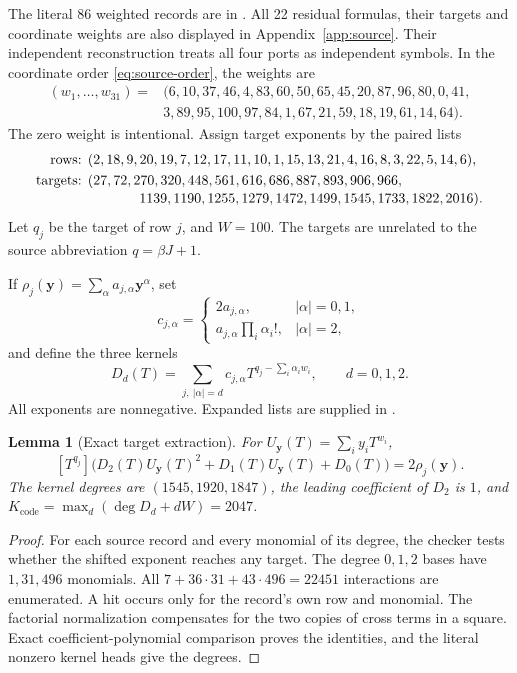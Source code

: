 \documentclass[11pt,a4paper]{article}
\newtheorem{lemma}[theorem]{Lemma}
\theoremstyle{remark}
\newcommand{\Kcode}{K_{\mathrm{code}}}
\newcommand{\code}[1]{\texttt{\detokenize{#1}}}
\begin{document}
The literal 86 weighted records are in
.
All 22 residual formulas, their targets and coordinate weights are
also displayed in Appendix~\ref{app:source}.
Their independent reconstruction treats all four ports as independent
symbols. In the coordinate order \eqref{eq:source-order}, the weights
are
\begin{equation}
\begin{split}
 (w_1,\ldots,w_{31})={}&
 (6,10,37,46,4,83,60,50,65,45,20,87,96,80,0,41,\\
 &3,89,95,100,97,84,1,67,21,59,18,19,61,14,64).
\end{split}
\label{eq:weights}
\end{equation}
The zero weight is intentional. Assign target exponents by the paired
lists
\begin{align*}
 \text{rows: }&
 (2,18,9,20,19,7,12,17,11,10,1,15,13,21,4,16,8,3,22,5,14,6),\\
 \text{targets: }&
 (27,72,270,320,448,561,616,686,887,893,906,966,\\[-2pt]
 &\hspace{13mm}1139,1190,1255,1279,1472,1499,1545,1733,1822,2016).
\end{align*}
Let \(q_j\) be the target of row \(j\), and \(W=100\).
The targets are unrelated to the source abbreviation \(q=\beta J+1\).

If \(\rho_j(\mathbf y)=\sum_\alpha a_{j,\alpha}\mathbf y^\alpha\),
set
\[
 c_{j,\alpha}=
 \begin{cases}
 2a_{j,\alpha},&|\alpha|=0,1,\\
 a_{j,\alpha}\prod_i\alpha_i!,&|\alpha|=2,
 \end{cases}
\]
and define the three kernels
\begin{equation}
 D_d(T)=\sum_{j,\ |\alpha|=d}
  c_{j,\alpha}T^{q_j-\sum_i\alpha_iw_i},\qquad d=0,1,2.
\label{eq:kernels}
\end{equation}
All exponents are nonnegative. Expanded lists are supplied in
\code{data/split_kernels.json}.

\begin{lemma}[Exact target extraction]
\label{lem:extract}
For \(U_{\mathbf y}(T)=\sum_i y_iT^{w_i}\),
\[
 [T^{q_j}]\bigl(D_2(T)U_{\mathbf y}(T)^2+
               D_1(T)U_{\mathbf y}(T)+D_0(T)\bigr)=2\rho_j(\mathbf y).
\]
The kernel degrees are \((1545,1920,1847)\), the leading coefficient
of \(D_2\) is \(1\), and
\(\Kcode=\max_d(\deg D_d+dW)=2047\).
\end{lemma}
\begin{proof}
For each source record and every monomial of its degree, the checker
tests whether the shifted exponent reaches any target. The degree
\(0,1,2\) bases have \(1,31,496\) monomials. All
\(7+36\cdot31+43\cdot496=22451\) interactions are enumerated.
A hit occurs only for the record's own row and monomial.
The factorial normalization compensates for the two copies of cross
terms in a square. Exact coefficient-polynomial comparison proves
the identities, and the literal nonzero kernel heads give the degrees.
\end{proof}
\end{document}
